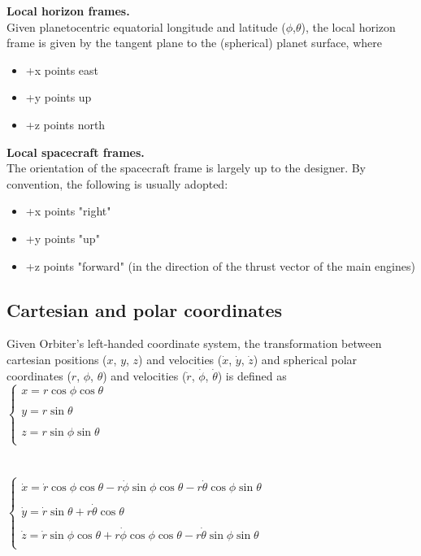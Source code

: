 \documentclass[Orbiter Technical Reference.tex]{subfiles}
\begin{document}
\noindent
\textbf{Local horizon frames.}\\
Given planetocentric equatorial longitude and latitude ($\phi$,$\theta$), the local horizon frame is given by the tangent plane to the (spherical) planet surface, where

\begin{itemize}
\item +x points east
\item +y points up
\item +z points north
\end{itemize}

\noindent
\textbf{Local spacecraft frames.}\\
The orientation of the spacecraft frame is largely up to the designer. By convention, the following is usually adopted:

\begin{itemize}
\item +x points "right"
\item +y points "up"
\item +z points "forward" (in the direction of the thrust vector of the main engines)
\end{itemize}

\noindent

\subsection{Cartesian and polar coordinates}
Given Orbiter's left-handed coordinate system, the transformation between cartesian positions ($x$, $y$, $z$) and velocities ($\dot{x}$, $\dot{y}$, $\dot{z}$) and spherical polar coordinates ($r$, $\phi$, $\theta$) and velocities ($\dot{r}$, $\dot{\phi}$, $\dot{\theta}$) is defined as\\

$
\left\{
\begin{array}{l}
x = r \cos\phi \cos\theta \\\\
y = r \sin\theta \\\\
z = r \sin\phi \sin\theta \\
\end{array} 
\right .
$
\\
\\
\\
\indent
$
\left\{
\begin{array}{l}
\dot{x} = \dot{r} \cos\phi \cos\theta - r \dot{\phi} \sin\phi\cos\theta - r \dot{\theta} \cos\phi\sin\theta \\\\
\dot{y} = \dot{r} \sin\theta + r \dot{\theta} \cos\theta \\\\
\dot{z} = \dot{r} \sin\phi \cos\theta + r \dot{\phi} \cos\phi\cos\theta - r \dot{\theta} \sin\phi\sin\theta \\
\end{array} 
\right .
$
\end{document}
